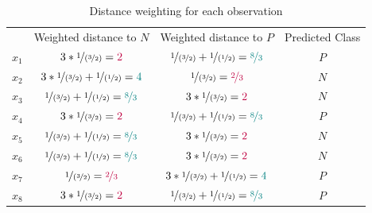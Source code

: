 \documentclass[12pt]{article}
\begin{document}
\begin{enumerate}[leftmargin=\labelsep]
        \begin{table}[h]
          \centering
          \renewcommand{\arraystretch}{1.35} %
          \begin{tabular}{c|c|c|c}
                  & Weighted distance to $N$                                                                                & Weighted distance to $P$                                                                                & Predicted Class \\
            $x_1$ & $3 * \nicefrac{1}{(\nicefrac{3}{2})} = \textcolor{purple}{2}$                                           & $\nicefrac{1}{(\nicefrac{3}{2})} + \nicefrac{1}{(\nicefrac{1}{2})} = \textcolor{teal}{\nicefrac{8}{3}}$ & $P$             \\
            $x_2$ & $3 * \nicefrac{1}{(\nicefrac{3}{2})} + \nicefrac{1}{(\nicefrac{1}{2})} = \textcolor{teal}{4}$           & $\nicefrac{1}{(\nicefrac{3}{2})} = \textcolor{purple}{\nicefrac{2}{3}}$                                 & $N$             \\
            $x_3$ & $\nicefrac{1}{(\nicefrac{3}{2})} + \nicefrac{1}{(\nicefrac{1}{2})} = \textcolor{teal}{\nicefrac{8}{3}}$ & $3 * \nicefrac{1}{(\nicefrac{3}{2})} = \textcolor{purple}{2}$                                           & $N$             \\
            $x_4$ & $3 * \nicefrac{1}{(\nicefrac{3}{2})} = \textcolor{purple}{2}$                                           & $\nicefrac{1}{(\nicefrac{3}{2})} + \nicefrac{1}{(\nicefrac{1}{2})} = \textcolor{teal}{\nicefrac{8}{3}}$ & $P$             \\
            $x_5$ & $\nicefrac{1}{(\nicefrac{3}{2})} + \nicefrac{1}{(\nicefrac{1}{2})} = \textcolor{teal}{\nicefrac{8}{3}}$ & $3 * \nicefrac{1}{(\nicefrac{3}{2})} = \textcolor{purple}{2}$                                           & $N$             \\
            $x_6$ & $\nicefrac{1}{(\nicefrac{3}{2})} + \nicefrac{1}{(\nicefrac{1}{2})} = \textcolor{teal}{\nicefrac{8}{3}}$ & $3 * \nicefrac{1}{(\nicefrac{3}{2})} = \textcolor{purple}{2}$                                           & $N$             \\
            $x_7$ & $\nicefrac{1}{(\nicefrac{3}{2})} = \textcolor{purple}{\nicefrac{2}{3}}$                                 & $3 * \nicefrac{1}{(\nicefrac{3}{2})} + \nicefrac{1}{(\nicefrac{1}{2})} = \textcolor{teal}{4}$           & $P$             \\
            $x_8$ & $3 * \nicefrac{1}{(\nicefrac{3}{2})} = \textcolor{purple}{2}$                                           & $\nicefrac{1}{(\nicefrac{3}{2})} + \nicefrac{1}{(\nicefrac{1}{2})} = \textcolor{teal}{\nicefrac{8}{3}}$ & $P$
          \end{tabular}
          \caption{Distance weighting for each observation}
          \label{tab:my-table-1}
        \end{table}


\end{enumerate}
\end{document}
